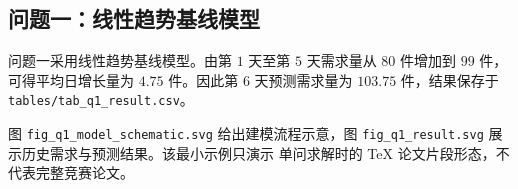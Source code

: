 \subsection{问题一：线性趋势基线模型}

问题一采用线性趋势基线模型。由第 \(1\) 天至第 \(5\) 天需求量从
\(80\) 件增加到 \(99\) 件，可得平均日增长量为 \(4.75\) 件。因此第
\(6\) 天预测需求量为 \(103.75\) 件，结果保存于
\verb|tables/tab_q1_result.csv|。

图 \verb|fig_q1_model_schematic.svg| 给出建模流程示意，图
\verb|fig_q1_result.svg| 展示历史需求与预测结果。该最小示例只演示
单问求解时的 TeX 论文片段形态，不代表完整竞赛论文。
